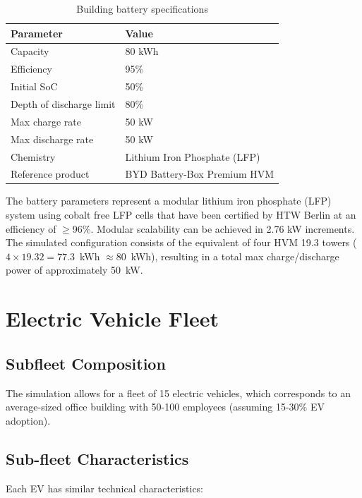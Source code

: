 \begin{table}[H]
\centering
\caption{Building battery specifications}
\label{tab:building_battery}
\begin{tabular}{@{}ll@{}}
\toprule
\textbf{Parameter} & \textbf{Value} \\
\midrule
Capacity & 80 kWh \\
Efficiency & 95\% \\
Initial SoC & 50\% \\
Depth of discharge limit & 80\% \\
Max charge rate & 50 kW \\
Max discharge rate & 50 kW \\
Chemistry & Lithium Iron Phosphate (LFP) \\
Reference product & BYD Battery-Box Premium HVM \\
\bottomrule
\end{tabular}
\end{table}

The battery parameters represent a modular lithium iron phosphate (LFP) system using cobalt free LFP cells that have been certified by HTW Berlin at an efficiency of $\geq$96\%. Modular scalability can be achieved in 2.76 kW increments. The simulated configuration consists of the equivalent of four HVM 19.3 towers ($4 \times 19.32 = 77.3$~kWh $\approx 80$~kWh), resulting in a total max charge/discharge power of approximately 50~kW.

\section{Electric Vehicle Fleet}
\label{sec:ev_fleet}

\subsection{Subfleet Composition}
\label{subsec:fleet_composition}

The simulation allows for a fleet of 15 electric vehicles, which corresponds to an average-sized office building with 50-100 employees (assuming 15-30\% EV adoption).

\subsection{Sub-fleet Characteristics}
\label{subsec:fleet_characteristics}

Each EV has similar technical characteristics:

